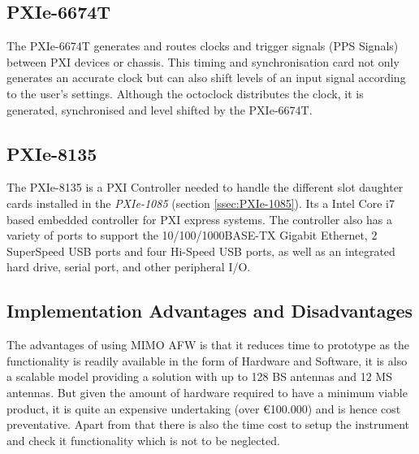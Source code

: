 \subsection{PXIe-6674T}\label{ssec:PXIe-6674T}
The PXIe-6674T generates and routes clocks and trigger signals (PPS Signals) between PXI devices or chassis. This timing and synchronisation card not only generates an accurate clock but can also shift levels of an input signal according to the user's settings. Although the octoclock distributes the clock, it is generated, synchronised and level shifted by the PXIe-6674T.

\subsection{PXIe-8135}\label{ssec:PXIe-8135}
The PXIe-8135 is a PXI Controller needed to handle the different slot daughter cards installed in the \emph{PXIe-1085} (section \ref{ssec:PXIe-1085}). Its a Intel Core i7 based embedded controller for PXI express systems. The controller also has a variety of ports to support the 10/100/1000BASE-TX Gigabit Ethernet, 2 SuperSpeed USB ports and four Hi-Speed USB ports, as well as an integrated hard drive, serial port, and other peripheral I/O.

\subsection{Implementation Advantages and Disadvantages}\label{ssec:MIMOAFWADVDISADV}
The advantages of using MIMO AFW is that it reduces time to prototype as the functionality is readily available in the form of Hardware and Software, it is also a scalable model providing a solution with up to 128 BS antennas and 12 MS antennas. But given the amount of hardware required to have a minimum viable product, it is quite an expensive undertaking (over €100.000) and is hence cost preventative. Apart from that there is also the time cost to setup the instrument and check it functionality which is not to be neglected.

